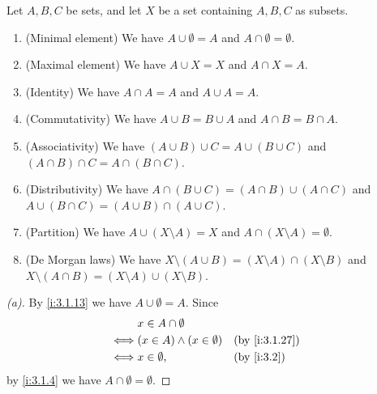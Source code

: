 \begin{prop}\label{i:3.1.28}
  Let \(A, B, C\) be sets, and let \(X\) be a set containing \(A, B, C\) as subsets.
  \begin{enumerate}
    \item (Minimal element) We have \(A \cup \emptyset = A\) and \(A \cap \emptyset = \emptyset\).
    \item (Maximal element) We have \(A \cup X = X\) and \(A \cap X = A\).
    \item (Identity) We have \(A \cap A = A\) and \(A \cup A = A\).
    \item (Commutativity) We have \(A \cup B = B \cup A\) and \(A \cap B = B \cap A\).
    \item (Associativity) We have \((A \cup B) \cup C = A \cup (B \cup C)\) and \((A \cap B) \cap C = A \cap (B \cap C)\).
    \item (Distributivity) We have \(A \cap (B \cup C) = (A \cap B) \cup (A \cap C)\) and \(A \cup (B \cap C) = (A \cup B) \cap (A \cup C)\).
    \item (Partition) We have \(A \cup (X \setminus A) = X\) and \(A \cap (X \setminus A) = \emptyset\).
    \item (De Morgan laws) We have \(X \setminus (A \cup B) = (X \setminus A) \cap (X \setminus B)\) and \(X \setminus (A \cap B) = (X \setminus A) \cup (X \setminus B)\).
  \end{enumerate}
\end{prop}

\begin{proof}[(a)]
  By \cref{i:3.1.13} we have \(A \cup \emptyset = A\).
  Since
  \begin{align*}
         & x \in A \cap \emptyset                               \\
    \iff & (x \in A) \land (x \in \emptyset) &  & \by{i:3.1.27} \\
    \iff & x \in \emptyset,                  &  & \by{i:3.2}
  \end{align*}
  by \cref{i:3.1.4} we have \(A \cap \emptyset = \emptyset\).
\end{proof}

